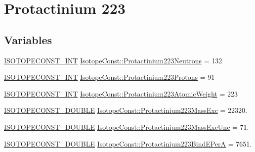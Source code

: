 \hypertarget{group___isotope_const-_protactinium-_pa223}{}\section{Protactinium 223}
\label{group___isotope_const-_protactinium-_pa223}
\subsection*{Variables}
\begin{DoxyCompactItemize}
\item 
\mbox{\hyperlink{group___isotope_const-_macros_ga5f18360b3e99483a35c32d789e62621c}{I\+S\+O\+T\+O\+P\+E\+C\+O\+N\+S\+T\+\_\+\+I\+NT}} \mbox{\hyperlink{group___isotope_const-_protactinium-_pa223_ga0b7a35bad1d9a823e7a9a8fbf54435fb}{Isotope\+Const\+::\+Protactinium223\+Neutrons}} = 132
\item 
\mbox{\hyperlink{group___isotope_const-_macros_ga5f18360b3e99483a35c32d789e62621c}{I\+S\+O\+T\+O\+P\+E\+C\+O\+N\+S\+T\+\_\+\+I\+NT}} \mbox{\hyperlink{group___isotope_const-_protactinium-_pa223_gaaab327f6824ba4d170518702890a8bde}{Isotope\+Const\+::\+Protactinium223\+Protons}} = 91
\item 
\mbox{\hyperlink{group___isotope_const-_macros_ga5f18360b3e99483a35c32d789e62621c}{I\+S\+O\+T\+O\+P\+E\+C\+O\+N\+S\+T\+\_\+\+I\+NT}} \mbox{\hyperlink{group___isotope_const-_protactinium-_pa223_ga6891d629a863a67792c6caaaf32b9872}{Isotope\+Const\+::\+Protactinium223\+Atomic\+Weight}} = 223
\item 
\mbox{\hyperlink{group___isotope_const-_macros_ga8f45a7272ce02c0b4c65c44636ed719a}{I\+S\+O\+T\+O\+P\+E\+C\+O\+N\+S\+T\+\_\+\+D\+O\+U\+B\+LE}} \mbox{\hyperlink{group___isotope_const-_protactinium-_pa223_ga84f8f2fe83f76bf51030ef05a6242b35}{Isotope\+Const\+::\+Protactinium223\+Mass\+Exc}} = 22320.
\item 
\mbox{\hyperlink{group___isotope_const-_macros_ga8f45a7272ce02c0b4c65c44636ed719a}{I\+S\+O\+T\+O\+P\+E\+C\+O\+N\+S\+T\+\_\+\+D\+O\+U\+B\+LE}} \mbox{\hyperlink{group___isotope_const-_protactinium-_pa223_ga85e0e707b671bb033ea2e9c52522cd53}{Isotope\+Const\+::\+Protactinium223\+Mass\+Exc\+Unc}} = 71.
\item 
\mbox{\hyperlink{group___isotope_const-_macros_ga8f45a7272ce02c0b4c65c44636ed719a}{I\+S\+O\+T\+O\+P\+E\+C\+O\+N\+S\+T\+\_\+\+D\+O\+U\+B\+LE}} \mbox{\hyperlink{group___isotope_const-_protactinium-_pa223_ga54775688191961d78402e9f47839e344}{Isotope\+Const\+::\+Protactinium223\+Bind\+E\+PerA}} = 7651.

\end{DoxyCompactItemize}
